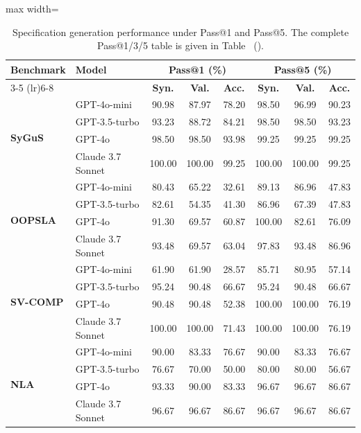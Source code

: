 



\begin{table}[t]
\centering
\caption{Specification generation performance under Pass@1 and Pass@5. The complete Pass@1/3/5 table is given in Table~ ().}
\label{tab:performance_rates_model}
\small
\setlength{\tabcolsep}{2.5pt}
\begin{adjustbox}{max width=\linewidth}
\begin{tabular}{ll ccc ccc}
\toprule
\multirow{2}{*}{\textbf{Benchmark}} & \multirow{2}{*}{\textbf{Model}}
& \multicolumn{3}{c}{\textbf{Pass@1 (\%)}}
& \multicolumn{3}{c}{\textbf{Pass@5 (\%)}} \\
\cmidrule(lr){3-5} \cmidrule(lr){6-8}
& & \textbf{Syn.} & \textbf{Val.} & \textbf{Acc.}
& \textbf{Syn.} & \textbf{Val.} & \textbf{Acc.} \\
\midrule

\multirow{4}{*}{\textbf{SyGuS}}
 & GPT-4o-mini & 90.98 & 87.97 & 78.20 & 98.50 & 96.99 & 90.23 \\
 & GPT-3.5-turbo & 93.23 & 88.72 & 84.21 & 98.50 & 98.50 & 93.23 \\
 & GPT-4o & 98.50 & 98.50 & 93.98 & 99.25 & 99.25 & 99.25 \\
 & Claude 3.7 Sonnet & 100.00 & 100.00 & 99.25 & 100.00 & 100.00 & 99.25 \\
    \midrule

\multirow{4}{*}{\textbf{OOPSLA}}
 & GPT-4o-mini & 80.43 & 65.22 & 32.61 & 89.13 & 86.96 & 47.83 \\
 & GPT-3.5-turbo & 82.61 & 54.35 & 41.30 & 86.96 & 67.39 & 47.83 \\
 & GPT-4o & 91.30 & 69.57 & 60.87 & 100.00 & 82.61 & 76.09 \\
 & Claude 3.7 Sonnet & 93.48 & 69.57 & 63.04 & 97.83 & 93.48 & 86.96 \\
\midrule

\multirow{4}{*}{\textbf{SV-COMP}}
 & GPT-4o-mini & 61.90 & 61.90 & 28.57 & 85.71 & 80.95 & 57.14 \\
 & GPT-3.5-turbo & 95.24 & 90.48 & 66.67 & 95.24 & 90.48 & 66.67 \\
 & GPT-4o & 90.48 & 90.48 & 52.38 & 100.00 & 100.00 & 76.19 \\
 & Claude 3.7 Sonnet & 100.00 & 100.00 & 71.43 & 100.00 & 100.00 & 76.19 \\
\midrule

\multirow{4}{*}{\textbf{NLA}}
 & GPT-4o-mini & 90.00 & 83.33 & 76.67 & 90.00 & 83.33 & 76.67 \\
 & GPT-3.5-turbo & 76.67 & 70.00 & 50.00 & 80.00 & 80.00 & 56.67 \\
& GPT-4o & 93.33 & 90.00 & 83.33 & 96.67 & 96.67 & 86.67 \\
& Claude 3.7 Sonnet & 96.67 & 96.67 & 86.67 & 96.67 & 96.67 & 86.67 \\
\midrule


\end{tabular}
\end{adjustbox}
\end{table}
